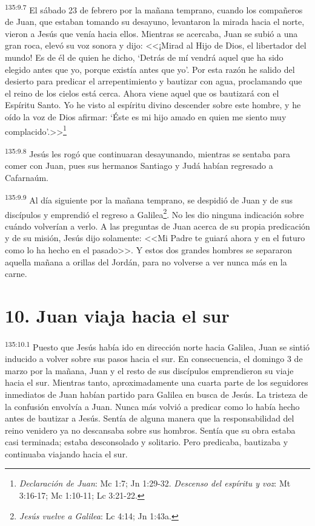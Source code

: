 \par 
\textsuperscript{135:9.7} El sábado 23 de febrero por la mañana temprano, cuando los compañeros de Juan, que estaban tomando su desayuno, levantaron la mirada hacia el norte, vieron a Jesús que venía hacia ellos. Mientras se acercaba, Juan se subió a una gran roca, elevó su voz sonora y dijo: <<¡Mirad al Hijo de Dios, el libertador del mundo! Es de él de quien he dicho, `Detrás de mí vendrá aquel que ha sido elegido antes que yo, porque existía antes que yo'. Por esta razón he salido del desierto para predicar el arrepentimiento y bautizar con agua, proclamando que el reino de los cielos está cerca. Ahora viene aquel que os bautizará con el Espíritu Santo. Yo he visto al espíritu divino descender sobre este hombre, y he oído la voz de Dios afirmar: `Éste es mi hijo amado en quien me siento muy complacido'.>>\footnote{\textit{Declaración de Juan}: Mc 1:7; Jn 1:29-32. \textit{Descenso del espíritu y voz}: Mt 3:16-17; Mc 1:10-11; Lc 3:21-22.}

\par 
\textsuperscript{135:9.8} Jesús les rogó que continuaran desayunando, mientras se sentaba para comer con Juan, pues sus hermanos Santiago y Judá habían regresado a Cafarnaúm.

\par 
\textsuperscript{135:9.9} Al día siguiente por la mañana temprano, se despidió de Juan y de sus discípulos y emprendió el regreso a Galilea\footnote{\textit{Jesús vuelve a Galilea}: Lc 4:14; Jn 1:43a.}. No les dio ninguna indicación sobre cuándo volverían a verlo. A las preguntas de Juan acerca de su propia predicación y de su misión, Jesús dijo solamente: <<Mi Padre te guiará ahora y en el futuro como lo ha hecho en el pasado>>. Y estos dos grandes hombres se separaron aquella mañana a orillas del Jordán, para no volverse a ver nunca más en la carne.

\section*{10. Juan viaja hacia el sur}
\par 
\textsuperscript{135:10.1} Puesto que Jesús había ido en dirección norte hacia Galilea, Juan se sintió inducido a volver sobre sus pasos hacia el sur. En consecuencia, el domingo 3 de marzo por la mañana, Juan y el resto de sus discípulos emprendieron su viaje hacia el sur. Mientras tanto, aproximadamente una cuarta parte de los seguidores inmediatos de Juan habían partido para Galilea en busca de Jesús. La tristeza de la confusión envolvía a Juan. Nunca más volvió a predicar como lo había hecho antes de bautizar a Jesús. Sentía de alguna manera que la responsabilidad del reino venidero ya no descansaba sobre sus hombros. Sentía que su obra estaba casi terminada; estaba desconsolado y solitario. Pero predicaba, bautizaba y continuaba viajando hacia el sur.

